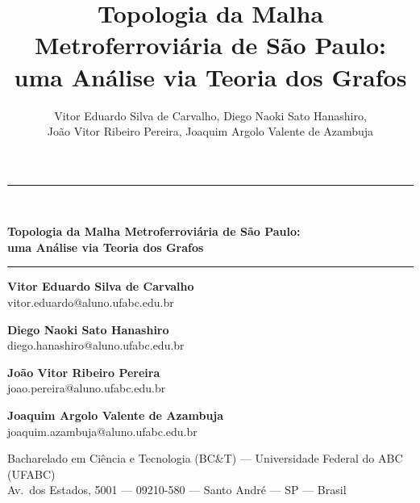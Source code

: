 \documentclass[12pt]{article}
\title{Topologia da Malha Metroferroviária de São Paulo:\\
  uma Análise via Teoria dos Grafos}
\author{Vitor Eduardo Silva de Carvalho\inst{1}, Diego Naoki Sato Hanashiro\inst{1},\\
  João Vitor Ribeiro Pereira\inst{1}, Joaquim Argolo Valente de Azambuja\inst{1}}
\begin{document}
\thispagestyle{empty}
\vspace*{-0.6cm}

\begin{center}
  \noindent\rule{\textwidth}{1pt}\\[12pt]
  {\LARGE\bfseries Topologia da Malha Metroferroviária de São Paulo:\\[4pt]
   uma Análise via Teoria dos Grafos\par}
  \vspace{12pt}
  \noindent\rule{\textwidth}{3pt}
\end{center}

\vspace{16pt}

\begin{center}
  \begin{minipage}[t]{0.32\textwidth}\centering
    \textbf{Vitor Eduardo Silva de Carvalho}\\[4pt]
    {\footnotesize vitor.eduardo@aluno.ufabc.edu.br}
  \end{minipage}\hfill
  \begin{minipage}[t]{0.32\textwidth}\centering
    \textbf{Diego Naoki Sato Hanashiro}\\[4pt]
    {\footnotesize diego.hanashiro@aluno.ufabc.edu.br}
  \end{minipage}\hfill
  \begin{minipage}[t]{0.32\textwidth}\centering
    \textbf{João Vitor Ribeiro Pereira}\\[4pt]
    {\footnotesize joao.pereira@aluno.ufabc.edu.br}
  \end{minipage}

  \vspace{12pt}

  \begin{minipage}[t]{0.45\textwidth}\centering
    \textbf{Joaquim Argolo Valente de Azambuja}\\[4pt]
    {\footnotesize joaquim.azambuja@aluno.ufabc.edu.br}
  \end{minipage}
\end{center}

\vspace{6pt}
{\centering\footnotesize
  Bacharelado em Ciência e Tecnologia (BC\&T) --- Universidade Federal do ABC (UFABC)\\
  Av.\ dos Estados, 5001 --- 09210-580 --- Santo André --- SP --- Brasil\par}

\vspace{12pt}
\end{document}
